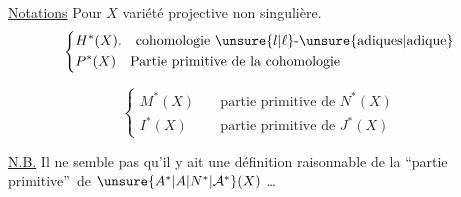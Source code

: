 \uline{Notations} \quad Pour $X$ variété projective non singulière.
\[
\left\{\begin{aligned}
&H^{*}(X).\quad \text{cohomologie $\unsure{l|\ell}$-\unsure{adiques|adique}}\\
&P^{*}(X)\quad \text{Partie primitive de la cohomologie}
\end{aligned}\right.
\]


\[
\left\{\begin{aligned}
M^{*}(X)&\quad\text{partie primitive de }N^{*}(X)\\
I^{*}(X)&\quad\text{partie primitive de }J^{*}(X)
\end{aligned}\right.
\]

\uline{N.B.} Il ne semble pas qu'il y ait une définition raisonnable de la \textquotedblleft partie primitive\textquotedblright\ de $\unsure{A^{*}|A|N^{*}|\mathcal A^{*}}(X)$ \ldots

